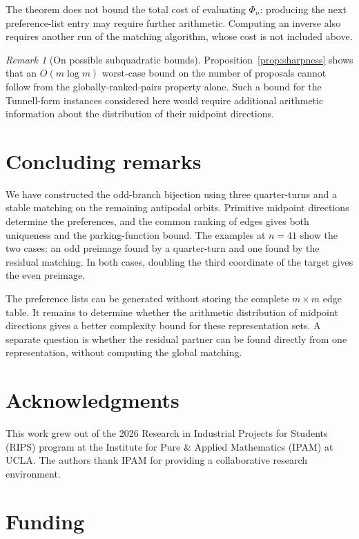 \documentclass[11pt]{amsart}
\theoremstyle{definition}
\theoremstyle{remark}
\newtheorem{remark}[theorem]{Remark}
\begin{document}
The theorem does not bound the total cost of evaluating $\Phi_n$: producing
the next preference-list entry may require further arithmetic.  Computing an
inverse also requires another run of the matching algorithm, whose cost is
not included above.

\begin{remark}[On possible subquadratic bounds]\label{rem:subquadratic}
Proposition~\ref{prop:sharpness} shows that an $O(m\log m)$ worst-case bound
on the number of proposals cannot follow from the globally-ranked-pairs
property alone.  Such a bound for the Tunnell-form instances considered here
would require additional
arithmetic information about the distribution of their midpoint directions.
\end{remark}

\section{Concluding remarks}\label{sec:audit}

We have constructed the odd-branch bijection using three quarter-turns and a
stable matching on the remaining antipodal orbits.  Primitive midpoint
directions determine the preferences, and the common ranking of edges gives
both uniqueness and the parking-function bound.  The examples at $n=41$
show the two cases: an odd preimage found by a quarter-turn and one found by
the residual matching.  In both cases, doubling the third coordinate of the
target gives the even preimage.

The preference lists can be generated without storing the complete
$m\times m$ edge table.  It remains to determine whether the arithmetic
distribution of midpoint directions gives a better complexity bound for
these representation sets.  A separate question is whether the residual
partner can be found directly from one representation, without computing
the global matching.

\section*{Acknowledgments}

This work grew out of the 2026 Research in Industrial Projects for Students
(RIPS) program at the Institute for Pure \& Applied Mathematics (IPAM) at
UCLA.  The authors thank IPAM for providing a collaborative research
environment.

\section*{Funding}
\end{document}
